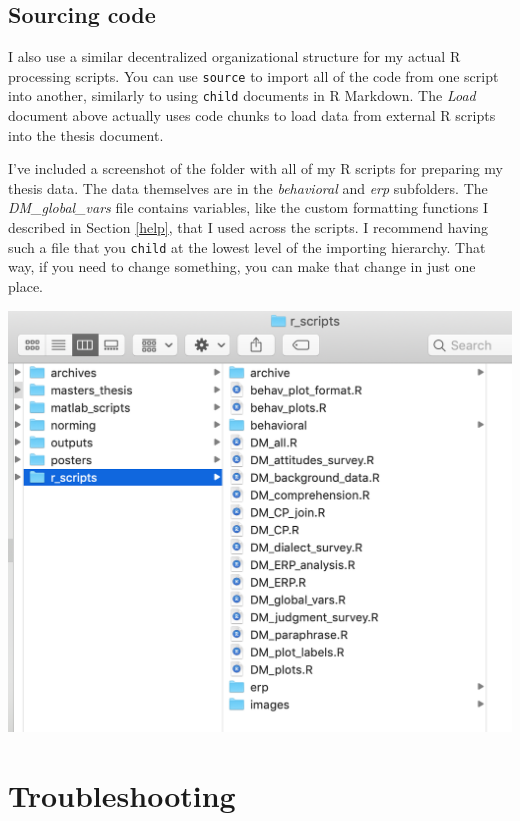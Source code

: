 \documentclass[
]{book}
\begin{document}
\hypertarget{source}{%
\section{Sourcing code}\label{source}}

I also use a similar decentralized organizational structure for my actual R processing scripts. You can use \texttt{source} to import all of the code from one script into another, similarly to using \texttt{child} documents in R Markdown. The \emph{Load} document above actually uses code chunks to load data from external R scripts into the thesis document.

I've included a screenshot of the folder with all of my R scripts for preparing my thesis data. The data themselves are in the \emph{behavioral} and \emph{erp} subfolders. The \emph{DM\_global\_vars} file contains variables, like the custom formatting functions I described in Section \ref{help}, that I used across the scripts. I recommend having such a file that you \texttt{child} at the lowest level of the importing hierarchy. That way, if you need to change something, you can make that change in just one place.

\includegraphics[width=14.39in]{images/content_organization_scripts}

\hypertarget{trouble}{%
\chapter{Troubleshooting}\label{trouble}}
\end{document}
